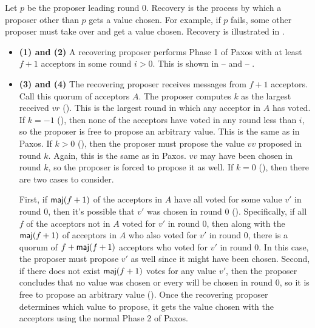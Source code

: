 Let $p$ be the proposer leading round $0$. Recovery is the process by which a
proposer other than $p$ gets a value chosen. For example, if $p$ fails, some
other proposer must take over and get a value chosen. Recovery is illustrated
in .

\begin{itemize}
  \item \textbf{(1) and (2)}
    A recovering proposer performs Phase 1 of Paxos with at least $f+1$
    acceptors in some round $i > 0$. This is shown in
      --
     and 
     -- .

  \item \textbf{(3) and (4)}
    The recovering proposer receives  messages from
    $f+1$ acceptors. Call this quorum of acceptors $A$. The proposer computes
    $k$ as the largest received $vr$ (). This is the largest
    round in which any acceptor in $A$ has voted. If $k = -1$ (),
    then none of the acceptors have voted in any round less than $i$, so the
    proposer is free to propose an arbitrary value. This is the same as in
    Paxos. If $k > 0$ (), then the proposer must propose the value
    $vv$ proposed in round $k$. Again, this is the same as in Paxos. $vv$ may
    have been chosen in round $k$, so the proposer is forced to propose it as
    well. If $k = 0$ (), then there are two cases to consider.

    First, if $\textsf{maj}(f+1)$ of the acceptors in $A$ have all voted for some value
    $v'$ in round $0$, then it's possible that $v'$ was chosen in round $0$
    (). Specifically, if all $f$ of the acceptors not in $A$
    voted for $v'$ in round $0$, then along with the $\textsf{maj}(f+1)$ of acceptors in
    $A$ who also voted for $v'$ in round $0$, there is a quorum of $f +
    \textsf{maj}(f+1)$ acceptors who voted for $v'$ in round $0$. In this case, the
    proposer must propose $v'$ as well since it might have been chosen. Second,
    if there does not exist $\textsf{maj}(f+1)$ votes for any value $v'$, then the
    proposer concludes that no value was chosen or every will be chosen in
    round $0$, so it is free to propose an arbitrary value
    (). Once the recovering proposer determines which value
    to propose, it gets the value chosen with the acceptors using the normal
    Phase 2 of Paxos.


\end{itemize}
